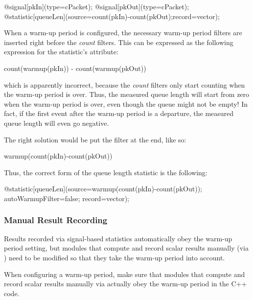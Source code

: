 \begin{ned}
@signal[pkIn](type=cPacket);
@signal[pkOut](type=cPacket);
@statistic[queueLen](source=count(pkIn)-count(pkOut);record=vector);
\end{ned}

When a warm-up period is configured, the necessary warm-up period filters are
inserted right before the \textit{count} filters. This can be expressed as the
following expression for the statistic's  attribute:

\begin{ned}
count(warmup(pkIn)) - count(warmup(pkOut))
\end{ned}

which is apparently incorrect, because the \textit{count} filters only start
counting when the warm-up period is over. Thus, the measured queue length will
start from zero when the warm-up period is over, even though the queue might not
be empty! In fact, if the first event after the warm-up period is a departure,
the measured queue length will even go negative.

The right solution would be put the  filter at the end, like so:

\begin{ned}
warmup(count(pkIn)-count(pkOut))
\end{ned}

Thus, the correct form of the queue length statistic is the following:

\begin{ned}
@statistic[queueLen](source=warmup(count(pkIn)-count(pkOut));
                     autoWarmupFilter=false;
                     record=vector);
\end{ned}


\subsubsection{Manual Result Recording}
\label{sec:ana-sim:warmup-period-manual-result-recording}

Results recorded via signal-based statistics automatically obey the warm-up
period setting, but modules that compute and record scalar results
manually (via ) need to be modified so that they take
the warm-up period into account.

\begin{note}
When configuring a warm-up period, make sure that modules that compute and
record scalar results manually via  actually obey the
warm-up period in the C++ code.
\end{note}

